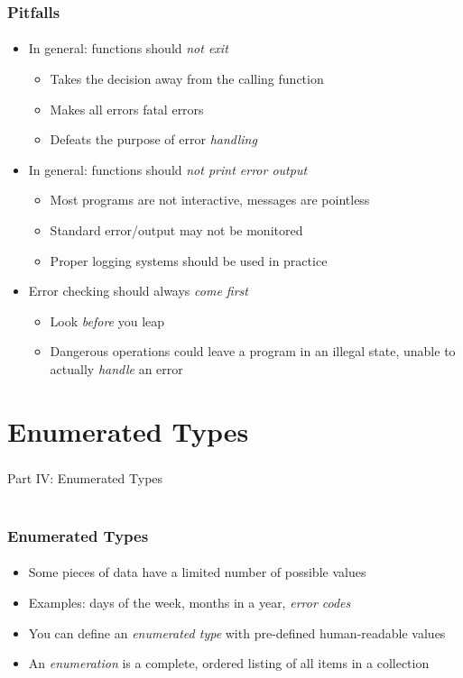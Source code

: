 \documentclass[]{beamer}
\begin{document}
\begin{frame}
    \frametitle{Pitfalls}
    \framesubtitle{}

\begin{itemize}[<+->]
  \item In general: functions should \emph{not exit}
  \begin{itemize}
    \item Takes the decision away from the calling function
    \item Makes all errors fatal errors
    \item Defeats the purpose of error \emph{handling}
  \end{itemize}
  \item In general: functions should \emph{not print error output}
  \begin{itemize}
    \item Most programs are not interactive, messages are pointless
    \item Standard error/output may not be monitored
    \item Proper logging systems should be used in practice
  \end{itemize}
  \item Error checking should always \emph{come first}
  \begin{itemize}
    \item Look \emph{before} you leap
    \item Dangerous operations could leave a program in an illegal state, unable to actually \emph{handle} an error
  \end{itemize}  
\end{itemize}

\end{frame}


\section{Enumerated Types}

\begin{frame}
    \frametitle{}
    \framesubtitle{}
    
    \begin{center}
    {\Huge Part IV: Enumerated Types}\\
    {\Large ~}
    \end{center}

\end{frame}

\begin{frame}
    \frametitle{Enumerated Types}
    \framesubtitle{}

\begin{itemize}[<+->]
  \item Some pieces of data have a limited number of possible values
  \item Examples: days of the week, months in a year, \emph{error codes}
  \item You can define an \emph{enumerated type} with pre-defined human-readable values
  \item An \emph{enumeration} is a complete, ordered listing of all items in a collection
\end{itemize}    
\end{frame}
\end{document}
